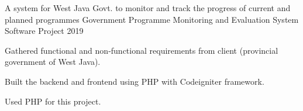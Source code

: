 \begin{cventries}
%    
    
    \cventry
        {A system for West Java Govt. to monitor and track the progress of current and planned programmes} %
        {Government Programme Monitoring and Evaluation System} %
        {Software Project} %
        {2019} %
        {
            \begin{cvitems} %
            	\item {Gathered functional and non-functional requirements from client (provincial government of West Java).}
                \item {Built the backend and frontend using PHP with Codeigniter framework.}
                \item {Used PHP for this project.}
            \end{cvitems}
        }


\end{cventries}
